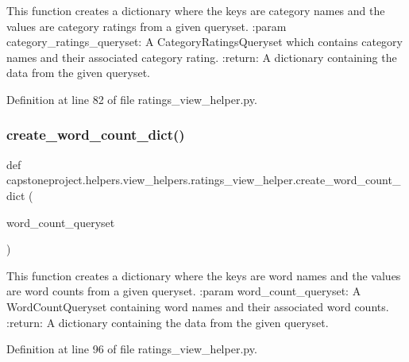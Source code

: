 \begin{DoxyVerb}This function creates a dictionary where the keys are category names
and the values are category ratings from a given queryset.
:param category_ratings_queryset: A CategoryRatingsQueryset which contains
category names and their associated category rating.
:return: A dictionary containing the data from the given queryset.
\end{DoxyVerb}
 

Definition at line 82 of file ratings\+\_\+view\+\_\+helper.\+py.

\mbox{\label{namespacecapstoneproject_1_1helpers_1_1view__helpers_1_1ratings__view__helper_a89961e5544cbcf87fb0f66b15e980169}} 
\subsubsection{\texorpdfstring{create\+\_\+word\+\_\+count\+\_\+dict()}{create\_word\_count\_dict()}}
{\footnotesize\ttfamily def capstoneproject.\+helpers.\+view\+\_\+helpers.\+ratings\+\_\+view\+\_\+helper.\+create\+\_\+word\+\_\+count\+\_\+dict (\begin{DoxyParamCaption}\item[{}]{word\+\_\+count\+\_\+queryset }\end{DoxyParamCaption})}

\begin{DoxyVerb}This function creates a dictionary where the keys are word names
and the values are word counts from a given queryset.
:param word_count_queryset: A WordCountQueryset containing word names
and their associated word counts.
:return: A dictionary containing the data from the given queryset.
\end{DoxyVerb}
 

Definition at line 96 of file ratings\+\_\+view\+\_\+helper.\+py.

\mbox{\label{namespacecapstoneproject_1_1helpers_1_1view__helpers_1_1ratings__view__helper_adc84fcd81842d2ed6863e4b53e003917}} 
